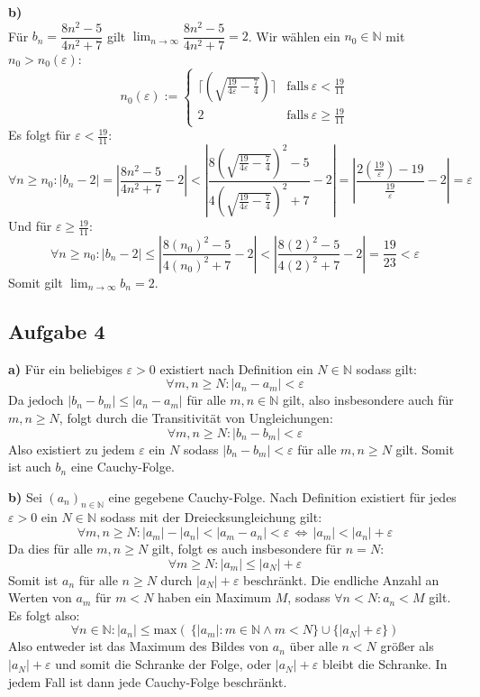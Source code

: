 \documentclass[a4paper,graphics,11pt]{article}
\newcommand{\aufgabe}[1]{\subsection*{Aufgabe #1}}
\begin{document}
\textbf{b)}\\
Für $b_n=\dfrac{8n^2-5}{4n^2+7}$ gilt $\lim_{n \to\infty}\limits \dfrac{8n^2-5}{4n^2+7}=2$.
Wir wählen ein $n_0 \in \mathbb{N}$ mit $n_0 > n_0(\varepsilon)$:
$$
    n_0(\varepsilon) := \begin{cases}
        \Big\lceil\left(\sqrt{\frac{19}{4\varepsilon} - \frac{7}{4}}\right)\Big\rceil
            & \text{falls}\ \varepsilon < \frac{19}{11}\\
        2
            & \text{falls}\ \varepsilon \geq \frac{19}{11}
    \end{cases}
$$
Es folgt für $\varepsilon < \frac{19}{11}\colon$
$$
    \forall n \geq n_0\colon \vert b_n -2\vert = \left|\frac{8n^2-5}{4n^2+7}-2\right| <
    \left|\frac{8\left(\sqrt{\frac{19}{4\varepsilon}-\frac{7}{4}} \right)^2-5}{4\left(\sqrt{\frac{19}{4\varepsilon} - \frac{7}{4}} \right)^2+7} -2\right|
    =\left|\frac{2(\frac{19}{\varepsilon})-19}{\frac{19}{\varepsilon}} -2\right| = \varepsilon
$$
Und für $\varepsilon \geq \frac{19}{11}\colon$
$$
    \forall n\geq n_0 \colon \vert b_n -2\vert \leq \left|\frac{8(n_0)^2-5}{4(n_0)^2+7}-2\right|
    < \left|\frac{8(2)^2-5}{4(2)^2+7}-2\right| = \frac{19}{23} < \varepsilon
$$
Somit gilt $\lim_{n \to \infty}\limits b_n = 2$.
\newpage
\aufgabe{4}
\textbf{a)}
Für ein beliebiges $\varepsilon > 0$ existiert nach Definition ein $N \in \mathbb{N}$ sodass
gilt:
$$
    \forall m,n \geq N\colon |a_n-a_m| < \varepsilon
$$
Da jedoch $|b_n - b_m| \leq |a_n-a_m|$ für alle $m,n \in \mathbb{N}$ gilt, also insbesondere
auch für $m,n \geq N$, folgt durch die Transitivität von Ungleichungen:
$$
    \forall m,n \geq N\colon |b_n-b_m| < \varepsilon
$$
Also existiert zu jedem $\varepsilon$ ein $N$ sodass $|b_n-b_m| < \varepsilon$ für alle
$m,n \geq N$ gilt. Somit ist auch $b_n$ eine Cauchy-Folge.


\textbf{b)}
Sei $(a_n)_{n \in \mathbb{N}}$ eine gegebene Cauchy-Folge. Nach Definition existiert
für jedes $\varepsilon >0$ ein $N \in \mathbb{N}$ sodass mit der Dreiecksungleichung gilt:
$$
    \forall m,n \geq N \colon |a_m|-|a_n|<|a_m-a_n| < \varepsilon 
    \,\Longleftrightarrow\, |a_m| < |a_n| + \varepsilon
$$
Da dies für alle $m,n \geq N$ gilt, folgt es auch insbesondere für $n=N$:
$$
    \forall m \geq N \colon |a_m| \leq |a_N|+\varepsilon
$$
Somit ist $a_n$ für alle $n \geq N$ durch $|a_N|+\varepsilon$ beschränkt.
Die endliche Anzahl an Werten von $a_m$ für $m<N$ haben ein Maximum $M$, sodass $\forall n <N\colon a_n < M$ gilt. Es folgt also:
$$
    \forall n \in \mathbb{N} \colon |a_n| \leq \text{max}(\ \{|a_m|\colon m\in \mathbb{N} \land m < N\}
    \cup \{|a_N|+\varepsilon\})
$$
Also entweder ist das Maximum des Bildes von $a_n$ über alle $n<N$ größer als
$|a_N|+\varepsilon$ und somit die Schranke der Folge, oder $|a_N|+\varepsilon$
bleibt die Schranke. In jedem Fall ist dann jede Cauchy-Folge beschränkt.
\end{document}
